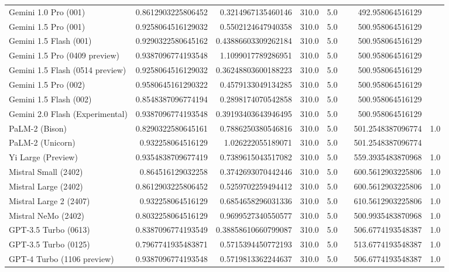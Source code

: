 \begin{table}[htp]
{\begin{tabular}{lrrrrrrr}
Gemini 1.0 Pro (001) & 0.8612903225806452 & 0.3214967135460146 & 310.0 & 5.0 &  & 492.958064516129 &  \\
Gemini 1.5 Pro (001) & 0.9258064516129032 & 0.5502124647940358 & 310.0 & 5.0 &  & 500.958064516129 &  \\
Gemini 1.5 Flash (001) & 0.9290322580645162 & 0.43886603309262184 & 310.0 & 5.0 &  & 500.958064516129 &  \\
Gemini 1.5 Pro (0409 preview) & 0.9387096774193548 & 1.1099017789286951 & 310.0 & 5.0 &  & 500.958064516129 &  \\
Gemini 1.5 Flash (0514 preview) & 0.9258064516129032 & 0.36248803600188223 & 310.0 & 5.0 &  & 500.958064516129 &  \\
Gemini 1.5 Pro (002) & 0.9580645161290322 & 0.4579133049134285 & 310.0 & 5.0 &  & 500.958064516129 &  \\
Gemini 1.5 Flash (002) & 0.8548387096774194 & 0.2898174070542858 & 310.0 & 5.0 &  & 500.958064516129 &  \\
Gemini 2.0 Flash (Experimental) & 0.9387096774193548 & 0.39193403643946495 & 310.0 & 5.0 &  & 500.958064516129 &  \\
PaLM-2 (Bison) & 0.8290322580645161 & 0.7886250380546816 & 310.0 & 5.0 &  & 501.2548387096774 & 1.0 \\
PaLM-2 (Unicorn) & 0.932258064516129 & 1.026222055189071 & 310.0 & 5.0 &  & 501.2548387096774 &  \\
Yi Large (Preview) & 0.9354838709677419 & 0.7389615043517082 & 310.0 & 5.0 &  & 559.3935483870968 & 1.0 \\
Mistral Small (2402) & 0.864516129032258 & 0.3742693070442446 & 310.0 & 5.0 &  & 600.5612903225806 & 1.0 \\
Mistral Large (2402) & 0.8612903225806452 & 0.5259702259494412 & 310.0 & 5.0 &  & 600.5612903225806 & 1.0 \\
Mistral Large 2 (2407) & 0.932258064516129 & 0.6854658296031336 & 310.0 & 5.0 &  & 610.5612903225806 & 1.0 \\
Mistral NeMo (2402) & 0.8032258064516129 & 0.9699527340550577 & 310.0 & 5.0 &  & 500.9935483870968 & 1.0 \\
GPT-3.5 Turbo (0613) & 0.8387096774193549 & 0.38858610660799087 & 310.0 & 5.0 &  & 506.6774193548387 & 1.0 \\
GPT-3.5 Turbo (0125) & 0.7967741935483871 & 0.5715394450772193 & 310.0 & 5.0 &  & 513.6774193548387 & 1.0 \\
GPT-4 Turbo (1106 preview) & 0.9387096774193548 & 0.5719813362244637 & 310.0 & 5.0 &  & 506.6774193548387 & 1.0 \\

\end{tabular}}
\end{table}
